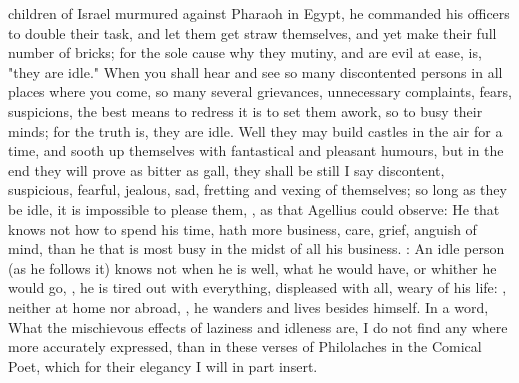 children of Israel murmured against Pharaoh in Egypt, he
commanded his officers to double their task, and let them get straw themselves,
and yet make their full number of bricks; for the sole cause why they mutiny,
and are evil at ease, is, "they are idle." When you shall hear and see so many
discontented persons in all places where you come, so many several grievances,
unnecessary complaints, fears, suspicions, the best means
to redress it is to set them awork, so to busy their minds; for the truth is,
they are idle. Well they may build castles in the air for a time, and sooth up
themselves with fantastical and pleasant humours, but in the end they will
prove as bitter as gall, they shall be still I say discontent, suspicious,
fearful, jealous, sad, fretting and vexing of themselves;
so long as they be idle, it is impossible to please them, , as that
Agellius could observe: He that knows not how to spend his
time, hath more business, care, grief, anguish of mind, than he that is most
busy in the midst of all his business. :
An idle person (as he follows it) knows not when he is well, what he would
have, or whither he would go, , he is
tired out with everything, displeased with all, weary of his life: , neither at home nor abroad, , he wanders and lives besides himself. In a word, What the mischievous
effects of laziness and idleness are, I do not find any where more accurately
expressed, than in these verses of Philolaches in the
Comical Poet, which for their elegancy I will in part
insert.

